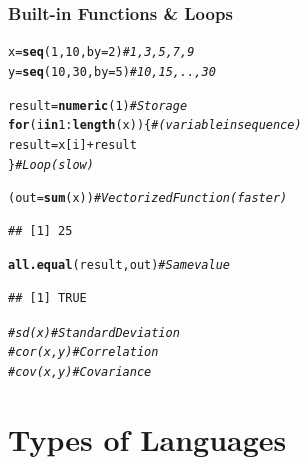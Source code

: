 \documentclass{beamer}\usepackage[]{graphicx}\usepackage[]{color}
\makeatletter
\newcommand{\hlnum}[1]{\textcolor[rgb]{0.686,0.059,0.569}{#1}}%
\newcommand{\hlcom}[1]{\textcolor[rgb]{0.678,0.584,0.686}{\textit{#1}}}%
\newcommand{\hlopt}[1]{\textcolor[rgb]{0,0,0}{#1}}%
\newcommand{\hlstd}[1]{\textcolor[rgb]{0.345,0.345,0.345}{#1}}%
\newcommand{\hlkwa}[1]{\textcolor[rgb]{0.161,0.373,0.58}{\textbf{#1}}}%
\newcommand{\hlkwb}[1]{\textcolor[rgb]{0.69,0.353,0.396}{#1}}%
\newcommand{\hlkwc}[1]{\textcolor[rgb]{0.333,0.667,0.333}{#1}}%
\newcommand{\hlkwd}[1]{\textcolor[rgb]{0.737,0.353,0.396}{\textbf{#1}}}%
\newenvironment{kframe}{%
 \def\at@end@of@kframe{}%
 \ifinner\ifhmode%
  \def\at@end@of@kframe{\end{minipage}}%
  \begin{minipage}{\columnwidth}%
 \fi\fi%
 \def\FrameCommand##1{\hskip\@totalleftmargin \hskip-\fboxsep
 \colorbox{shadecolor}{##1}\hskip-\fboxsep
     \hskip-\linewidth \hskip-\@totalleftmargin \hskip\columnwidth}%
 \MakeFramed {\advance\hsize-\width
   \@totalleftmargin\z@ \linewidth\hsize
   \@setminipage}}%
 {\par\unskip\endMakeFramed%
 \at@end@of@kframe}
\newenvironment{knitrout}{}{} %
\makeatother
\begin{document}
\begin{frame}[fragile]
\frametitle{Built-in Functions \& Loops}
\begin{knitrout}
\color{fgcolor}\begin{kframe}
\begin{alltt}
\hlstd{x} \hlkwb{=} \hlkwd{seq}\hlstd{(}\hlnum{1}\hlstd{,} \hlnum{10}\hlstd{,} \hlkwc{by} \hlstd{=} \hlnum{2}\hlstd{)}   \hlcom{# 1, 3, 5, 7, 9}
\hlstd{y} \hlkwb{=} \hlkwd{seq}\hlstd{(}\hlnum{10}\hlstd{,} \hlnum{30}\hlstd{,} \hlkwc{by} \hlstd{=} \hlnum{5}\hlstd{)}  \hlcom{# 10, 15, .. , 30}

\hlstd{result} \hlkwb{=} \hlkwd{numeric}\hlstd{(}\hlnum{1}\hlstd{)}      \hlcom{# Storage}
\hlkwa{for}\hlstd{(i} \hlkwa{in} \hlnum{1}\hlopt{:}\hlkwd{length}\hlstd{(x))\{}   \hlcom{# (variable in sequence)}
  \hlstd{result} \hlkwb{=} \hlstd{x[i]} \hlopt{+} \hlstd{result}
\hlstd{\}}                        \hlcom{# Loop (slow)}

\hlstd{(out} \hlkwb{=} \hlkwd{sum}\hlstd{(x))}           \hlcom{# Vectorized Function (faster)}
\end{alltt}
\begin{verbatim}
## [1] 25
\end{verbatim}
\begin{alltt}
\hlkwd{all.equal}\hlstd{(result, out)}   \hlcom{# Same value}
\end{alltt}
\begin{verbatim}
## [1] TRUE
\end{verbatim}
\begin{alltt}
\hlcom{#sd(x)                   # Standard Deviation}
\hlcom{#cor(x,y)                # Correlation}
\hlcom{#cov(x,y)                # Covariance}
\end{alltt}
\end{kframe}
\end{knitrout}
\end{frame}

\section{Types of Languages}
\end{document}
